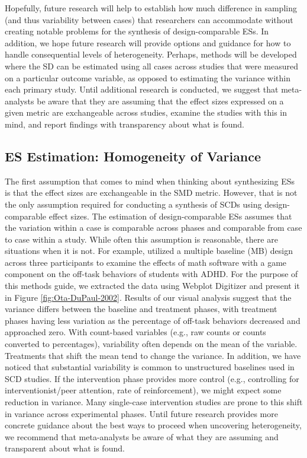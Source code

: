 \documentclass[
]{book}
\begin{document}
Hopefully, future research will help to establish how much difference in sampling (and thus variability between cases) that researchers can accommodate without creating notable problems for the synthesis of design-comparable ESs. In addition, we hope future research will provide options and guidance for how to handle consequential levels of heterogeneity. Perhaps, methods will be developed where the SD can be estimated using all cases across studies that were measured on a particular outcome variable, as opposed to estimating the variance within each primary study. Until additional research is conducted, we suggest that meta-analysts be aware that they are assuming that the effect sizes expressed on a given metric are exchangeable across studies, examine the studies with this in mind, and report findings with transparency about what is found.

\hypertarget{es-estimation-homogeneity-of-variance}{%
\subsection{ES Estimation: Homogeneity of Variance}\label{es-estimation-homogeneity-of-variance}}

The first assumption that comes to mind when thinking about synthesizing ESs is that the effect sizes are exchangeable in the SMD metric. However, that is not the only assumption required for conducting a synthesis of SCDs using design-comparable effect sizes. The estimation of design-comparable ESs assumes that the variation within a case is comparable across phases and comparable from case to case within a study. While often this assumption is reasonable, there are situations when it is not. For example, \citet{ota2002Task} utilized a multiple baseline (MB) design across three participants to examine the effects of math software with a game component on the off-task behaviors of students with ADHD. For the purpose of this methods guide, we extracted the data using Webplot Digitizer \citep{rohatgi2015Webplotdigitizer} and present it in Figure \ref{fig:Ota-DuPaul-2002}. Results of our visual analysis suggest that the variance differs between the baseline and treatment phases, with treatment phases having less variation as the percentage of off-task behaviors decreased and approached zero. With count-based variables (e.g., raw counts or counts converted to percentages), variability often depends on the mean of the variable. Treatments that shift the mean tend to change the variance. In addition, we have noticed that substantial variability is common to unstructured baselines used in SCD studies. If the intervention phase provides more control (e.g., controlling for interventionist/peer attention, rate of reinforcement), we might expect some reduction in variance. Many single-case intervention studies are prone to this shift in variance across experimental phases. Until future research provides more concrete guidance about the best ways to proceed when uncovering heterogeneity, we recommend that meta-analysts be aware of what they are assuming and transparent about what is found.
\end{document}
